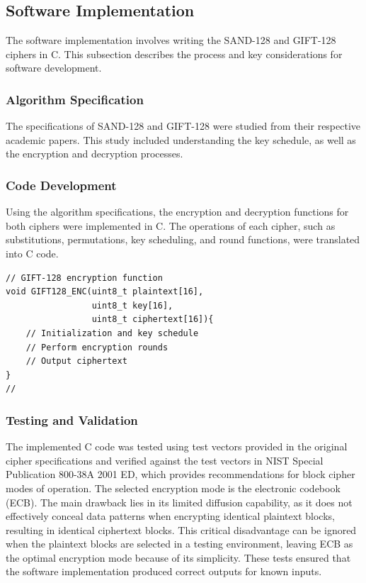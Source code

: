 \documentclass[conference]{IEEEtran}
\begin{document}
\subsection{Software Implementation}

The software implementation involves writing the SAND-128 and GIFT-128 ciphers in C. This subsection describes the process and key considerations for software development.

\subsubsection{Algorithm Specification}

The specifications of SAND-128 and GIFT-128 were studied from their respective academic papers. This study included understanding the key schedule, as well as the encryption and decryption processes.

\subsubsection{Code Development}

Using the algorithm specifications, the encryption and decryption functions for both ciphers were implemented in C. The operations of each cipher, such as substitutions, permutations, key scheduling, and round functions, were translated into C code.

\begin{verbatim}
// GIFT-128 encryption function
void GIFT128_ENC(uint8_t plaintext[16],
                 uint8_t key[16],
                 uint8_t ciphertext[16]){
    // Initialization and key schedule
    // Perform encryption rounds
    // Output ciphertext
}
//
\end{verbatim}

\subsubsection{Testing and Validation}

The implemented C code was tested using test vectors provided in the original cipher specifications and verified against the test vectors in NIST Special Publication 800-38A 2001 ED\cite{dworkin2001recommendation}, which provides recommendations for block cipher modes of operation. The selected encryption mode is the electronic codebook (ECB). The main drawback lies in its limited diffusion capability, as it does not effectively conceal data patterns when encrypting identical plaintext blocks, resulting in identical ciphertext blocks. This critical disadvantage can be ignored when the plaintext blocks are selected in a testing environment, leaving ECB as the optimal encryption mode because of its simplicity. These tests ensured that the software implementation produced correct outputs for known inputs.
\end{document}
